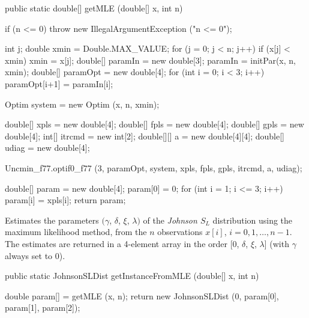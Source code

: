 \begin{code}

   public static double[] getMLE (double[] x, int n)\begin{hide} {
      if (n <= 0)
         throw new IllegalArgumentException ("n <= 0");

      int j;
      double xmin = Double.MAX_VALUE;
      for (j = 0; j < n; j++) {
         if (x[j] < xmin)
            xmin = x[j];
      }
      double[] paramIn = new double[3];
      paramIn = initPar(x, n, xmin);
      double[] paramOpt = new double[4];
      for (int i = 0; i < 3; i++)
         paramOpt[i+1] = paramIn[i];

      Optim system = new Optim (x, n, xmin);

      double[] xpls = new double[4];
      double[] fpls = new double[4];
      double[] gpls = new double[4];
      int[] itrcmd = new int[2];
      double[][] a = new double[4][4];
      double[] udiag = new double[4];

      Uncmin_f77.optif0_f77 (3, paramOpt, system, xpls, fpls, gpls,
                             itrcmd, a, udiag);

      double[] param = new double[4];
      param[0] = 0;
      for (int i = 1; i <= 3; i++)
         param[i] = xpls[i];
      return param;
   }\end{hide}
\end{code}
\begin{tabb}
   Estimates the parameters $(\gamma$, $\delta$, $\xi$, $\lambda)$ of the
   \emph{Johnson $S_L$} distribution using the maximum likelihood method,
   from the $n$ observations $x[i]$, $i = 0, 1,\ldots, n-1$.
   The estimates are returned in a 4-element array in the order
   [0, $\delta$, $\xi$, $\lambda$] (with $\gamma$ always set to 0).
\end{tabb}
\begin{htmlonly}
\end{htmlonly}
\begin{code}

   public static JohnsonSLDist getInstanceFromMLE (double[] x, int n)\begin{hide} {
      double param[] = getMLE (x, n);
      return new JohnsonSLDist (0, param[0], param[1], param[2]);
   }\end{hide}
\end{code}
